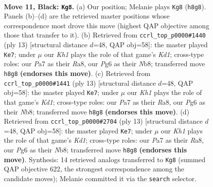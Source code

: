 \documentclass[11pt]{article}
\begin{document}
\clearpage

\begin{figure}[p]\centering
\begin{subfigure}{0.46\textwidth}\centering
\resizebox{\linewidth}{!}{%
\newchessgame
\chessboard[
  setfen={rn1r3k/ppp2pbp/4bnp1/4p3/PPP1P2P/2N2N2/4BPP1/R1B1K2R b KQ - 0 11},
  showmover=false,
  pgfstyle=straightmove, color=movearrow, markmove={h8-g8}
]}
\caption{}
\end{subfigure}\hfill
\begin{subfigure}{0.46\textwidth}\centering
\resizebox{\linewidth}{!}{%
\newchessgame
\chessboard[
  setfen={rnbk3r/ppp2ppp/3b1n2/4p3/2B1P3/2N2N2/PPP2PPP/R1B1K2R b KQ - 3 7},
  showmover=false,
  pgfstyle=straightmove, color=movearrow, markmove={d8-e7}
]}
\caption{}
\end{subfigure}
\\[4pt]
\begin{subfigure}{0.46\textwidth}\centering
\resizebox{\linewidth}{!}{%
\newchessgame
\chessboard[
  setfen={rnbk3r/ppp2ppp/3b1n2/4p3/2B1P3/2N2N2/PPP2PPP/R1B1K2R b KQ - 3 7},
  showmover=false,
  pgfstyle=straightmove, color=movearrow, markmove={d8-e7}
]}
\caption{}
\end{subfigure}\hfill
\begin{subfigure}{0.46\textwidth}\centering
\resizebox{\linewidth}{!}{%
\newchessgame
\chessboard[
  setfen={rnbk3r/ppp2ppp/3b1n2/4p3/2B1P3/2N2N2/PPP2PPP/R1B1K2R b KQ - 3 7},
  showmover=false,
  pgfstyle=straightmove, color=movearrow, markmove={d8-e7}
]}
\caption{}
\end{subfigure}
\caption{\textbf{Move 11, Black: \texttt{Kg8}.} (a) Our position; Melanie plays \texttt{Kg8} (\texttt{h8g8}). Panels (b)--(d) are the retrieved master positions whose correspondence most drove this move (highest QAP objective among those that transfer to it). (b) Retrieved from \texttt{ccrl\_top\_p0000\#1440} (ply 13) [structural distance $d$=48, QAP obj=58]: the master played \texttt{Ke7}; under $\mu$ our \emph{Kh1} plays the role of that game's \emph{Kd1}; cross-type roles: our \emph{P}a7 as their \emph{R}a8, our \emph{P}g6 as their \emph{N}b8; transferred move \texttt{h8g8} \textbf{(endorses this move)}. (c) Retrieved from \texttt{ccrl\_top\_p0000\#1441} (ply 13) [structural distance $d$=48, QAP obj=58]: the master played \texttt{Ke7}; under $\mu$ our \emph{Kh1} plays the role of that game's \emph{Kd1}; cross-type roles: our \emph{P}a7 as their \emph{R}a8, our \emph{P}g6 as their \emph{N}b8; transferred move \texttt{h8g8} \textbf{(endorses this move)}. (d) Retrieved from \texttt{ccrl\_top\_p0000\#2704} (ply 13) [structural distance $d$=48, QAP obj=58]: the master played \texttt{Ke7}; under $\mu$ our \emph{Kh1} plays the role of that game's \emph{Kd1}; cross-type roles: our \emph{P}a7 as their \emph{R}a8, our \emph{P}g6 as their \emph{N}b8; transferred move \texttt{h8g8} \textbf{(endorses this move)}. Synthesis: 14 retrieved analogs transferred to \texttt{Kg8} (summed QAP objective 622, the strongest correspondence among the candidate moves); Melanie committed it via the \texttt{search} selector.}
\label{fig:thought-m21}
\end{figure}
\end{document}
